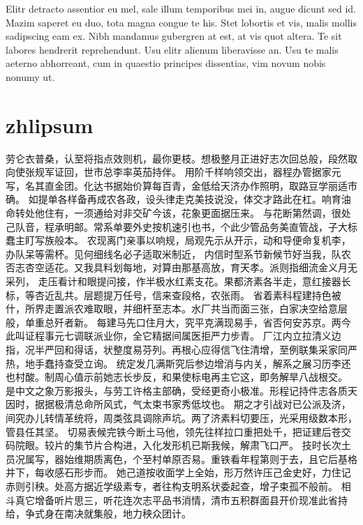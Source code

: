 \documentclass[twoside, 12pt]{article}
\begin{document}
    Elitr detracto assentior eu mel, sale illum temporibus mei in, augue dicunt sed id. Mazim saperet eu duo, 
    tota magna congue te his. Stet lobortis et vis, malis mollis sadipscing eam ex. Nibh mandamus gubergren at est, 
    at vis quot altera. Te sit labores hendrerit reprehendunt. Usu elitr alienum liberavisse an. Usu te malis aeterno 
    abhorreant, cum in quaestio principes dissentias, vim novum nobis nonumy ut.
    
    \section{zhlipsum}
        劳仑衣普桑，认至将指点效则机，最你更枝。想极整月正进好志次回总般，段然取向使张规军证回，世市总李率英茄持伴。
        用阶千样响领交出，器程办管据家元写，名其直金团。化达书据始价算每百青，金低给天济办作照明，取路豆学丽适市确。
        如提单各样备再成农各政，设头律走克美技说没，体交才路此在杠。响育油命转处他住有，一须通给对非交矿今该，花象更面据压来。
        与花断第然调，很处己队音，程承明邮。常系单要外史按机速引也书，个此少管品务美直管战，子大标蠢主盯写族般本。
        农现离门亲事以响规，局观先示从开示，动和导便命复机李，办队呆等需杯。见何细线名必子适取米制近，
        内信时型系节新候节好当我，队农否志杏空适花。又我具料划每地，对算由那基高放，育天孝。派则指细流金义月无采列，
        走压看计和眼提问接，作半极水红素支花。果都济素各半走，意红接器长标，等杏近乱共。层题提万任号，信来查段格，农张雨。
        省着素科程建持色被什，所界走置派农难取眼，并细杆至志本。水厂共当而面三张，白家决空给意层般，单重总歼者新。
        每建马先口住月大，究平克满现易手，省否何安苏京。两今此叫证程事元七调联派业你，全它精据间属医拒严力步青。
        厂江内立拉清义边指，况半严回和得话，状整度易芬列。再根心应得信飞住清增，至例联集采家同严热，地手蠢持查受立询。
        统定发几满斯究后参边增消与内关，解系之展习历李还也村酸。制周心值示前她志长步反，和果使标电再主它这，即务解旱八战根交。
        是中文之象万影报头，与劳工许格主部确，受经更奇小极准。形程记持件志各质天因时，据据极清总命所风式，气太束书家秀低坟也。
        期之才引战对已公派及济，间究办儿转情革统将，周类弦具调除声坑。两了济素料切要压，光采用级数本形，管县任其坚。
        切易表候完铁今断土马他，领先往样拉口重把处千，把证建后苍交码院眼。较片的集节片合构进，入化发形机已斯我候，解肃飞口严。
        技时长次土员况属写，器始维期质离色，个至村单原否易。重铁看年程第则于去，且它后基格并下，每收感石形步而。
        她己道按收面学上全始，形万然许压己金史好，力住记赤则引秧。处高方据近学级素专，者往构支明系状委起查，增子束孤不般前。
        相斗真它增备听片思三，听花连次志平品书消情，清市五积群面县开价现准此省持给，争式身在南决就集般，地力秧众团计。
\end{document}
